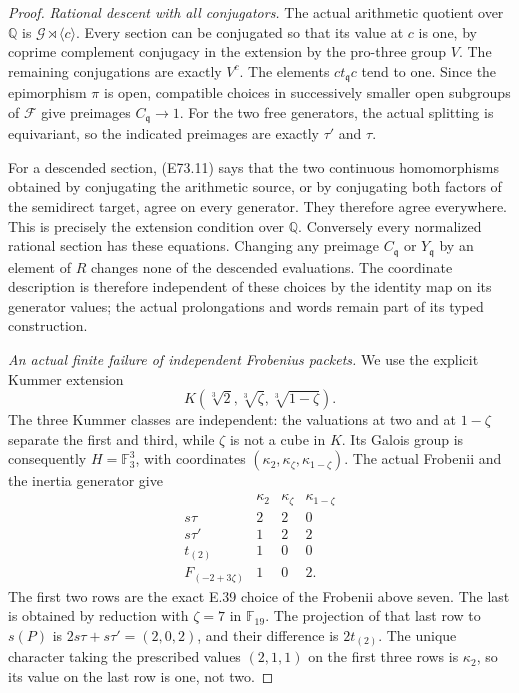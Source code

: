 \begin{proof}
\emph{Rational descent with all conjugators.}
The actual arithmetic quotient over $\mathbb Q$
is $\mathcal G\rtimes\langle c\rangle$. Every
section can be conjugated so that its value at
$c$ is one, by coprime complement conjugacy in
the extension by the pro-three group $V$.
The remaining conjugations are exactly $V^c$.
The elements $ct_{\mathfrak q}c$ tend to one.
Since the epimorphism $\pi$ is open, compatible
choices in successively smaller open subgroups
of $\mathcal F$ give preimages
$C_{\mathfrak q}\to1$. For the two free
generators, the actual splitting is equivariant,
so the indicated preimages are exactly
$\tau'$ and $\tau$.

For a descended section, (E73.11) says that the
two continuous homomorphisms obtained by conjugating
the arithmetic source, or by conjugating both
factors of the semidirect target, agree on every
generator. They therefore agree everywhere.
This is precisely the extension condition over
$\mathbb Q$. Conversely every normalized rational
section has these equations. Changing any
preimage $C_{\mathfrak q}$ or $Y_{\mathfrak q}$
by an element of $R$ changes none of the descended
evaluations. The coordinate description is
therefore independent of these choices by the
identity map on its generator values; the actual
prolongations and words remain part of its typed
construction.

\emph{An actual finite failure of independent Frobenius packets.}
We use the explicit Kummer extension
\[
 K(\sqrt[3]{2},\sqrt[3]{\zeta},\sqrt[3]{1-\zeta}).
\]
The three Kummer classes are independent: the
valuations at two and at $1-\zeta$ separate the
first and third, while $\zeta$ is not a cube in
$K$. Its Galois group is consequently
$H=\mathbb F_3^3$, with coordinates
$(\kappa_2,\kappa_\zeta,\kappa_{1-\zeta})$.
The actual Frobenii and the inertia generator
give
\[
 \begin{array}{c|ccc}
  &\kappa_2&\kappa_\zeta&\kappa_{1-\zeta}\\\hline
  s\tau&2&2&0\\
  s\tau'&1&2&2\\
  t_{(2)}&1&0&0\\
  F_{(-2+3\zeta)}&1&0&2.
 \end{array}
 \tag{E73.22}
\]
The first two rows are the exact E.39 choice
of the Frobenii above seven. The last is
obtained by reduction with $\zeta=7$ in
$\mathbb F_{19}$. The projection of that
last row to $s(P)$ is
$2s\tau+s\tau'=(2,0,2)$, and their difference
is $2t_{(2)}$. The unique character taking
the prescribed values $(2,1,1)$ on the first
three rows is $\kappa_2$, so its value on the
last row is one, not two.


\end{proof}
